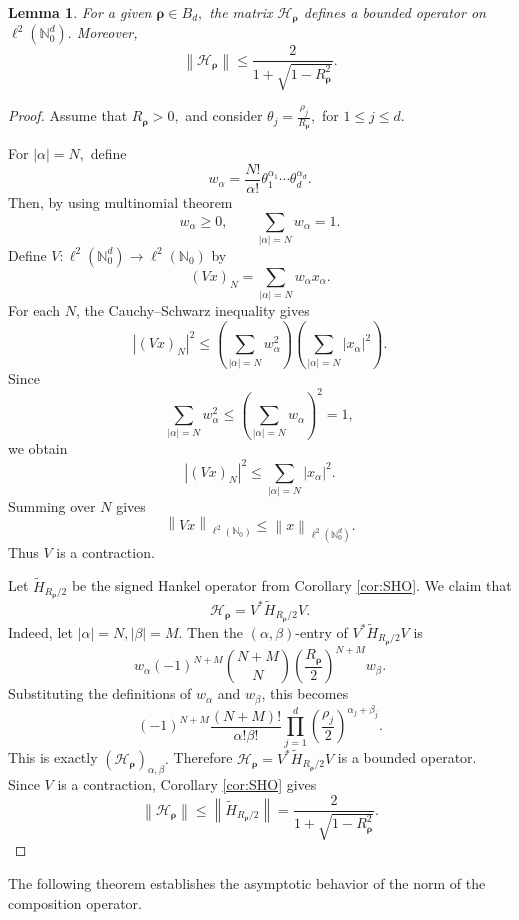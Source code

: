 \documentclass[12pt, reqno]{amsart}
\numberwithin{equation}{section}
\newtheorem{lemma}[theorem]{Lemma}
\begin{document}
\begin{lemma}
\label{lem:fp-boundedness-H-rho}
For a given $\boldsymbol{\rho}\in B_d,$  the matrix $\mathcal{H}_{\boldsymbol{\rho}}$ defines a bounded  operator on $\ell^2(\mathbb{N}_{0}^{d}).$
Moreover,
\[
\left\|\mathcal{H}_{\boldsymbol{\rho}}\right\|
\leq
\frac{2}{1+\sqrt{1-R_{\boldsymbol{\rho}}^2}}.
\]
\end{lemma}
\begin{proof}
Assume that $R_{\boldsymbol{\rho}}>0,$ and consider
 $\theta_j = \frac{\rho_j}{R_{\boldsymbol{\rho}}},$  for $ 1\leq j\leq d.$

For $|\alpha|=N,$ define
\[
w_{\alpha}
=
\frac{N!}{\alpha!}
\theta_1^{\alpha_1}\cdots \theta_d^{\alpha_d}.
\]
Then, by using multinomial theorem
\[
w_{\alpha}\geq 0,
\qquad
\sum_{|\alpha|=N}w_{\alpha}=1.
\]
Define $V:\ell^2(\mathbb{N}_{0}^{d})\to \ell^2(\mathbb{N}_{0})$
by
\[
(Vx)_N
=
\sum_{|\alpha|=N}w_{\alpha}x_{\alpha}.
\]
For each \(N\), the Cauchy--Schwarz inequality gives
\[
|(Vx)_N|^2
\leq
\left(\sum_{|\alpha|=N}w_{\alpha}^2\right)
\left(\sum_{|\alpha|=N}|x_{\alpha}|^2\right).
\]
Since
\[
\sum_{|\alpha|=N}w_{\alpha}^2
\leq
\left(\sum_{|\alpha|=N}w_{\alpha}\right)^2
=
1,
\]
we obtain
\[
|(Vx)_N|^2
\leq
\sum_{|\alpha|=N}|x_{\alpha}|^2.
\]
Summing over \(N\) gives
\[
\left\|Vx\right\|_{\ell^2(\mathbb{N}_{0})}
\leq
\left\|x\right\|_{\ell^2(\mathbb{N}_{0}^{d})}.
\]
Thus \(V\) is a contraction.

Let $\widetilde{H}_{R_{\boldsymbol{\rho}}/2}$ be the signed Hankel operator from  Corollary \ref{cor:SHO}. We claim that
\[
\mathcal{H}_{\boldsymbol{\rho}}
=
V^{*}\widetilde{H}_{R_{\boldsymbol{\rho}}/2}V.
\]
Indeed, let $|\alpha|=N, |\beta|=M$. Then the \((\alpha,\beta)\)-entry of
$V^{*}\widetilde{H}_{R_{\boldsymbol{\rho}}/2}V$ is
\[
w_{\alpha}
(-1)^{N+M}
\binom{N+M}{N}
\left(\frac{R_{\boldsymbol{\rho}}}{2}\right)^{N+M}
w_{\beta}.
\]
Substituting the definitions of \(w_{\alpha}\) and \(w_{\beta}\), this becomes
\[
(-1)^{N+M}
\frac{(N+M)!}{\alpha!\beta!}
\prod_{j=1}^{d}
\left(\frac{\rho_j}{2}\right)^{\alpha_j+\beta_j}.
\]
This is exactly $(\mathcal{H}_{\boldsymbol{\rho}})_{\alpha,\beta}.$
Therefore
$\mathcal{H}_{\boldsymbol{\rho}}
=
V^{*}\widetilde{H}_{R_{\boldsymbol{\rho}}/2}V$
is a bounded operator.
Since \(V\) is a contraction, Corollary \ref{cor:SHO} gives
\[
\left\|\mathcal{H}_{\boldsymbol{\rho}}\right\|
\leq
\left\|\widetilde{H}_{R_{\boldsymbol{\rho}}/2}\right\|
=
\frac{2}{1+\sqrt{1-R_{\boldsymbol{\rho}}^2}}.
\]
\end{proof}

The following theorem establishes the asymptotic behavior of the norm of the composition operator.
\end{document}
